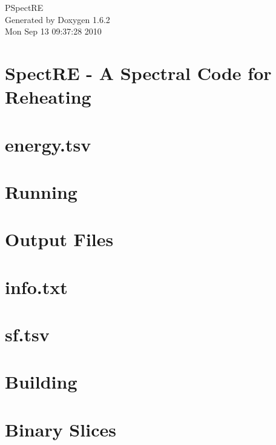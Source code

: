 \documentclass[letterpaper]{book}
\begin{document}
\hypersetup{pageanchor=false}
\begin{titlepage}
\vspace*{7cm}
\begin{center}
{\Large PSpectRE }\\
\vspace*{1cm}
{\large Generated by Doxygen 1.6.2}\\
\vspace*{0.5cm}
{\small Mon Sep 13 09:37:28 2010}\\
\end{center}
\end{titlepage}
\clearemptydoublepage
{}
\tableofcontents
\clearemptydoublepage
{}
\hypersetup{pageanchor=true}
\chapter{SpectRE -\/ A Spectral Code for Reheating}
\label{index}\hypertarget{index}{}
\chapter{energy.tsv}
\label{energy_tsv}
\hypertarget{energy_tsv}{}

\chapter{Running}
\label{running}
\hypertarget{running}{}

\chapter{Output Files}
\label{outputs}
\hypertarget{outputs}{}

\chapter{info.txt}
\label{info_txt}
\hypertarget{info_txt}{}

\chapter{sf.tsv}
\label{sf_tsv}
\hypertarget{sf_tsv}{}

\chapter{Building}
\label{building}
\hypertarget{building}{}

\chapter{Binary Slices}
\label{slices}
\hypertarget{slices}{}

\end{document}
